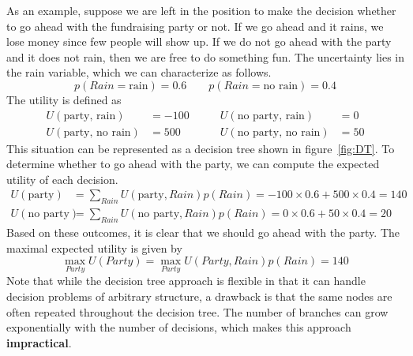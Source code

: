 \documentclass{article}
\begin{document}
As an example, suppose we are left in the position to make the decision whether to go ahead with the fundraising party or not. If we go ahead and it rains, we lose money since few people will show up. If we do not go ahead with the party and it does not rain, then we are free to do something fun. The uncertainty lies in the rain variable, which we can characterize as follows. 
$$
    p(Rain = \text{rain}) = 0.6 \qquad p(Rain = \text{no rain}) = 0.4 
$$
\noindent The utility is defined as
\begin{align*}
    U(\text{party, rain}) &= -100 \qquad& U(\text{no party, rain}) &= 0 \\
    U(\text{party, no rain}) &= 500 \qquad& U(\text{no party, no rain}) &= 50 
\end{align*}
\noindent This situation can be represented as a decision tree shown in figure~\ref{fig:DT}. To determine whether to go ahead with the party, we can compute the expected utility of each decision. 
\begin{align*}
    U(\text{party}) &= \sum_{Rain} U(\text{party}, Rain)p(Rain) = -100 \times 0.6 + 500 \times 0.4 = 140 \\
    U(\text{no party}) &= \sum_{Rain} U(\text{no party}, Rain)p(Rain) = 0 \times 0.6 + 50 \times 0.4 = 20
\end{align*}
\noindent Based on these outcomes, it is clear that we should go ahead with the party. The maximal expected utility is given by 
$$
    \max_{Party} U(Party) = \max_{Party} U(Party, Rain) p(Rain) = 140
$$
\noindent Note that while the decision tree approach is flexible in that it can handle decision problems of arbitrary structure, a drawback is that the same nodes are often repeated throughout the decision tree. The number of branches can grow exponentially with the number of decisions, which makes this approach \textbf{impractical}. 
\end{document}

